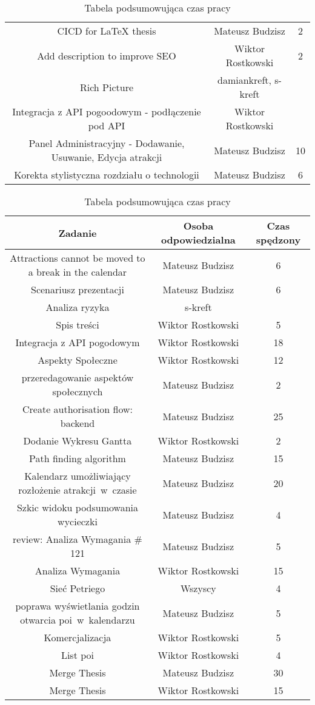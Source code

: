 \begin{table}[h!]
\begin{tabular}{|c|c|c|}
CICD for LaTeX thesis	&	Mateusz Budzisz	&	2	\\
Add description to improve SEO	&	Wiktor Rostkowski	&	2	\\
Rich Picture	&	damiankreft, s-kreft	&		\\
Integracja z API pogoodowym - podłączenie pod API	&	Wiktor Rostkowski	&		\\
Panel Administracyjny - Dodawanie, Usuwanie, Edycja atrakcji	&	Mateusz Budzisz	&	10	\\
Korekta stylistyczna rozdziału o technologii	&	Mateusz Budzisz	&	6	\\
\hline
\end{tabular}
\caption{Tabela podsumowująca czas pracy}
\label{tab:podsumowanie prac}
\end{table}

\begin{table}[h!]
    \centering
    \begin{tabular}{|c|c|c|}
        \hline					
        Zadanie	&	Osoba odpowiedzialna	& Czas spędzony\\
        \hline		
Attractions cannot be moved to a  break in the calendar	&	Mateusz Budzisz	&	6	\\
Scenariusz prezentacji	&	Mateusz Budzisz	&	6	\\
Analiza ryzyka	&	s-kreft	&		\\
Spis treści	&	Wiktor Rostkowski	&	5	\\
Integracja z API pogodowym 	&	Wiktor Rostkowski	&	18	\\
Aspekty Społeczne	&	Wiktor Rostkowski	&	12	\\
przeredagowanie aspektów społecznych	&	Mateusz Budzisz	&	2	\\
Create authorisation flow: backend 	&	Mateusz Budzisz	&	25	\\
Dodanie Wykresu Gantta	&	Wiktor Rostkowski	&	2	\\
Path finding algorithm	&	Mateusz Budzisz	&	15	\\
Kalendarz umożliwiający rozłożenie atrakcji~w~czasie	&	Mateusz Budzisz	&	20	\\
Szkic widoku podsumowania wycieczki	&	Mateusz Budzisz	&	4	\\
review: Analiza Wymagania \# 121	&	Mateusz Budzisz	&	5	\\
Analiza Wymagania	&	Wiktor Rostkowski	&	15	\\
Sieć Petriego	&	Wszyscy	&	4	\\
poprawa wyświetlania godzin otwarcia poi~w~kalendarzu	&	Mateusz Budzisz	&	5	\\
Komercjalizacja	&	Wiktor Rostkowski	&	5	\\
List poi	&	Wiktor Rostkowski	&	4	\\
Merge Thesis	&	Mateusz Budzisz	&	30	\\
Merge Thesis	&	Wiktor Rostkowski	&	15	\\
\hline
\end{tabular}
\caption{Tabela podsumowująca czas pracy}
\label{tab:podsumowanie prac}
\end{table}